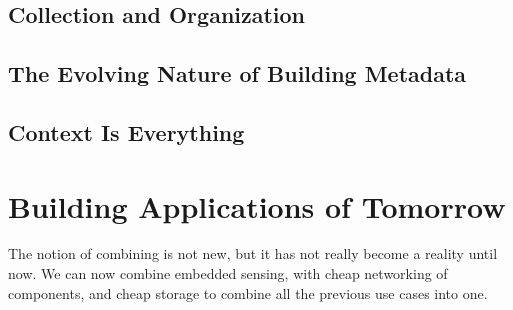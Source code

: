 \subsection{Collection and Organization}
\subsection{The Evolving Nature of Building Metadata}
\subsection{Context Is Everything}

\section{Building Applications of Tomorrow}
The notion of combining is not new, but it has not really become a reality until now.  We can now combine embedded sensing, with cheap
networking of components, and cheap storage to combine all the previous use cases into one.











